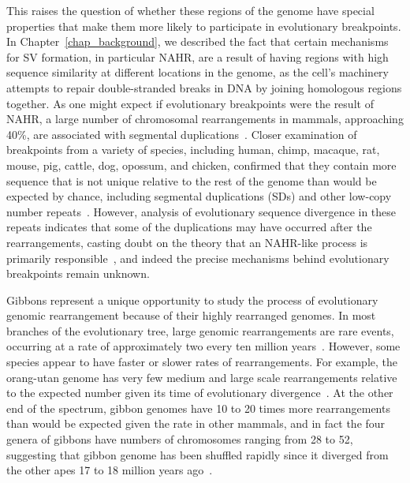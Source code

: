 This raises the question of whether these regions of the genome have special properties that make them more likely to participate in evolutionary breakpoints. In Chapter~\ref{chap_background}, we described the fact that certain mechanisms for SV formation, in particular NAHR, are a result of having regions with high sequence similarity at different locations in the genome, as the cell's machinery attempts to repair double-stranded breaks in DNA by joining homologous regions together. As one might expect if evolutionary breakpoints were the result of NAHR, a large number of chromosomal rearrangements in mammals, approaching 40\%, are associated with segmental duplications~\cite{Bailey:2004fb,Bailey:2006fn}. Closer examination of breakpoints from a variety of species, including human, chimp, macaque, rat, mouse, pig, cattle, dog, opossum, and chicken, confirmed that they contain more sequence that is not unique relative to the rest of the genome than would be expected by chance, including segmental duplications (SDs) and other low-copy number repeats~\cite{Larkin:2009ij}. However, analysis of evolutionary sequence divergence in these repeats indicates that some of the duplications may have occurred after the rearrangements, casting doubt on the theory that an NAHR-like process is primarily responsible~\cite{Bailey:2004fb}, and indeed the precise mechanisms behind evolutionary breakpoints remain unknown.

Gibbons represent a unique opportunity to study the process of evolutionary genomic rearrangement because of their highly rearranged genomes. In most branches of the evolutionary tree, large genomic rearrangements are rare events, occurring at a rate of approximately two every ten million years~\cite{Wienberg:2004gt}. However, some species appear to have faster or slower rates of rearrangements. For example, the orang-utan genome has very few medium and large scale rearrangements relative to the expected number given its time of evolutionary divergence~\cite{Locke:2011gn}. At the other end of the spectrum, gibbon genomes have 10 to 20 times more rearrangements than would be expected given the rate in other mammals, and in fact the four genera of gibbons have numbers of chromosomes ranging from 28 to 52, suggesting that gibbon genome has been shuffled rapidly since it diverged from the other apes 17 to 18 million years ago~\cite{Misceo:2008kg}.

